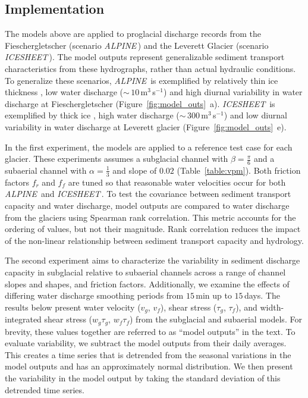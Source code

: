 \documentclass[tc, manuscript]{copernicus}
\newcommand{\alpine}{\textit{ALPINE}\,}
\newcommand{\icesheet}{\textit{ICESHEET}\,}
\begin{document}
\FloatBarrier
\subsection{Implementation}
\label{sect:imp}

The models above are applied to proglacial discharge records from the Fieschergletscher (scenario \alpine{}) and the Leverett Glacier (scenario \icesheet{}).
The model outputs represent generalizable sediment transport characteristics from these hydrographs, rather than actual hydraulic conditions.
To generalize these scenarios, \alpine{}  is exemplified by relatively thin ice thickness \citep[$h_{ice}$= $225$\,\unit{m}][]{grab2021}, low water discharge ($\sim\,10$\,\unit{m}$^3$\,\unit{s}$^{-1}$) and high diurnal variability in water discharge at Fieschergletscher (Figure~\ref{fig:model_outs}\, a).
\icesheet{}  is exemplified by thick ice  \citep[$h_{ice}$= $700$\,\unit{m}; ][]{morlighem2017}, high water discharge ($\sim\,300$\,\unit{m}$^3$\,\unit{s}$^{-1}$)  and low diurnal variability in water discharge at Leverett glacier (Figure~\ref{fig:model_outs}\, e).

In the first experiment, the models are applied to a reference test case for each glacier.
These experiments assumes  a subglacial channel with $\beta=\frac{\pi}{6}$ and a subaerial channel with $\alpha = \frac{1}{3}$ and slope of $0.02$ (Table~\ref{table:vpm}).
Both friction factors $f_r$ and $f_f$ are tuned so that reasonable water velocities \citep[$\sim\,1- 1.5\,$\unit{m}\,\unit{s}$^{-1}$][]{werder2010b,chandler2013} occur for both \alpine{} and \icesheet{}.
To test the covariance between sediment transport capacity and water discharge, model outputs are compared to water discharge from the glaciers using Spearman rank correlation.
This metric accounts for the ordering of values, but not their magnitude.
Rank correlation reduces the impact of the non-linear relationship between sediment transport capacity and hydrology.


The second experiment aims to characterize the variability in sediment discharge capacity in subglacial relative to subaerial channels across a range of channel slopes and shapes, and friction factors.
Additionally, we examine the effects of differing water discharge smoothing periods from $15$\,\unit{min} up to $15$\,\unit{days}.
The results below present water velocity ($v_g$, $v_f$), shear stress ($\tau_g$, $\tau_f$), and width-integrated shear stress ($w_g\tau_g$, $w_f\tau_f$) from the subglacial and subaerial models.
For brevity, these values together are referred to as ``model outputs'' in the text.
To evaluate variability, we subtract the model outputs from their daily averages. 
This creates a time series that is detrended from the seasonal variations in the model outputs and has an approximately normal distribution.
We then present the variability in the model output by taking the standard deviation of this detrended time series.
\end{document}
